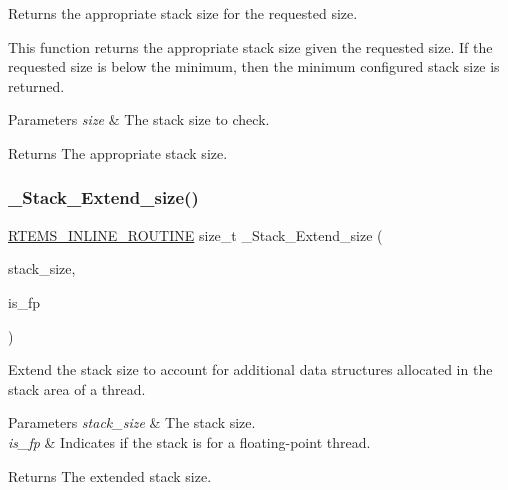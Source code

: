 Returns the appropriate stack size for the requested size. 

This function returns the appropriate stack size given the requested size. If the requested size is below the minimum, then the minimum configured stack size is returned.


\begin{DoxyParams}{Parameters}
{\em size} & The stack size to check.\\
\hline
\end{DoxyParams}
\begin{DoxyReturn}{Returns}
The appropriate stack size. 
\end{DoxyReturn}
\mbox{\label{group__RTEMSScoreStack_gaa7306251dbd0baec560422cbfc02b4ab}} 
\subsubsection{\texorpdfstring{\_Stack\_Extend\_size()}{\_Stack\_Extend\_size()}}
{\footnotesize\ttfamily \mbox{\hyperlink{group__RTEMSScoreBaseDefs_gac216239df231d5dbd15e3520b0b9313f}{R\+T\+E\+M\+S\+\_\+\+I\+N\+L\+I\+N\+E\+\_\+\+R\+O\+U\+T\+I\+NE}} size\+\_\+t \+\_\+\+Stack\+\_\+\+Extend\+\_\+size (\begin{DoxyParamCaption}\item[{size\+\_\+t}]{stack\+\_\+size,  }\item[{bool}]{is\+\_\+fp }\end{DoxyParamCaption})}



Extend the stack size to account for additional data structures allocated in the stack area of a thread. 


\begin{DoxyParams}{Parameters}
{\em stack\+\_\+size} & The stack size. \\
\hline
{\em is\+\_\+fp} & Indicates if the stack is for a floating-\/point thread.\\
\hline
\end{DoxyParams}
\begin{DoxyReturn}{Returns}
The extended stack size. 
\end{DoxyReturn}
\mbox{\label{group__RTEMSScoreStack_ga66b144669f2508254620147bedd9baaa}} 
